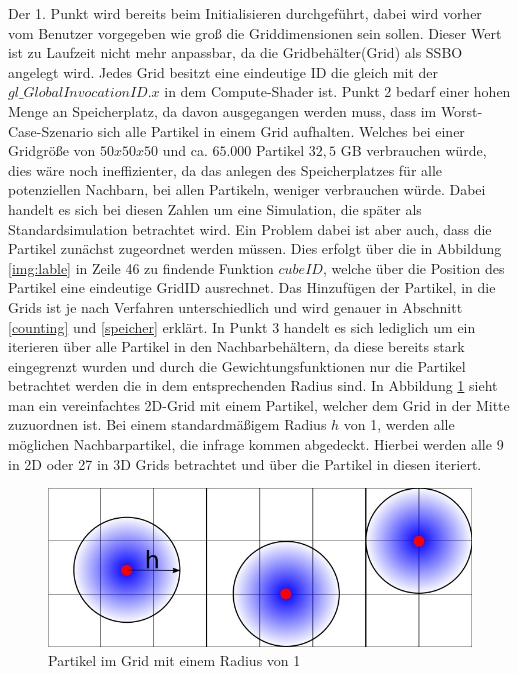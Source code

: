 \documentclass[intern,palatino]{cgBA}
\begin{document}
Der 1. Punkt wird bereits beim Initialisieren durchgeführt, dabei wird vorher vom Benutzer vorgegeben wie groß die Griddimensionen sein sollen. Dieser Wert ist zu Laufzeit nicht mehr anpassbar, da die Gridbehälter(Grid) als SSBO angelegt wird. Jedes Grid besitzt eine eindeutige ID die gleich mit der $gl\_GlobalInvocationID.x$ in dem Compute-Shader ist. 
\newline
Punkt 2 bedarf einer hohen Menge an Speicherplatz, da davon ausgegangen werden muss, dass im Worst-Case-Szenario sich alle Partikel in einem Grid aufhalten. Welches bei einer Gridgröße von $50x50x50$ und ca. $65.000$ Partikel $32,5$ GB verbrauchen würde, dies wäre noch ineffizienter, da das anlegen des Speicherplatzes für alle potenziellen Nachbarn, bei allen Partikeln, weniger verbrauchen würde. Dabei handelt es sich bei diesen Zahlen um eine Simulation, die später als Standardsimulation betrachtet wird.
\newline
Ein Problem dabei ist aber auch, dass die Partikel zunächst zugeordnet werden müssen. Dies erfolgt über die in Abbildung \ref{img:lable} in Zeile 46 zu findende Funktion $cubeID$, welche über die Position des Partikel eine eindeutige GridID ausrechnet. Das Hinzufügen der Partikel, in die Grids ist je nach Verfahren unterschiedlich und wird genauer in Abschnitt \ref{counting} und \ref{speicher}  erklärt.
\newline
In Punkt 3 handelt es sich lediglich um ein iterieren über alle Partikel in den Nachbarbehältern, da diese bereits stark eingegrenzt wurden und durch die Gewichtungsfunktionen nur die Partikel betrachtet werden die in dem entsprechenden Radius sind.
\newline
In Abbildung \ref{img:grid} sieht man ein vereinfachtes 2D-Grid mit einem Partikel, welcher dem Grid in der Mitte zuzuordnen ist. Bei einem standardmäßigem Radius $h$ von 1, werden alle möglichen Nachbarpartikel, die infrage kommen abgedeckt. Hierbei werden alle 9 in 2D oder 27 in 3D Grids betrachtet und über die Partikel in diesen iteriert.

\begin{figure}[H]
	\centering
	\includegraphics[width=1\columnwidth]{Bilder/grid.jpg}
	\caption{Partikel im Grid mit einem Radius von 1}
	\label{img:grid}
\end{figure}
\end{document}
